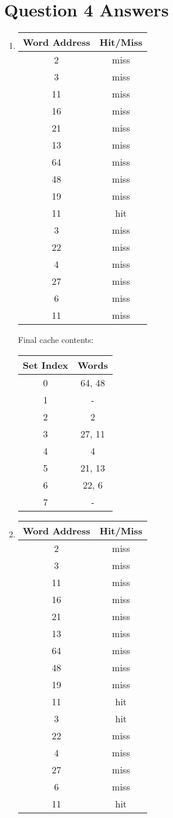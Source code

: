 \documentclass{article}
\begin{document}
\section*{Question 4 Answers}

\begin{enumerate}

\item[a.]
\begin{tabular}{|c|c|}
\hline
Word Address & Hit/Miss \\
\hline
2 & miss \\
3 & miss \\
11 & miss \\
16 & miss \\
21 & miss \\
13 & miss \\
64 & miss \\
48 & miss \\
19 & miss \\
11 & hit \\
3 & miss \\
22 & miss \\
4 & miss \\
27 & miss \\
6 & miss \\
11 & miss \\
\hline
\end{tabular}

Final cache contents:
\begin{tabular}{|c|c|}
\hline
Set Index & Words \\
\hline
0 & 64, 48 \\
1 & - \\
2 & 2 \\
3 & 27, 11 \\
4 & 4 \\
5 & 21, 13 \\
6 & 22, 6 \\
7 & - \\
\hline
\end{tabular}

\item[b.]
\begin{tabular}{|c|c|}
\hline
Word Address & Hit/Miss \\
\hline
2 & miss \\
3 & miss \\
11 & miss \\
16 & miss \\
21 & miss \\
13 & miss \\
64 & miss \\
48 & miss \\
19 & miss \\
11 & hit \\
3 & hit \\
22 & miss \\
4 & miss \\
27 & miss \\
6 & miss \\
11 & hit \\
\hline
\end{tabular}


\end{enumerate}
\end{document}
